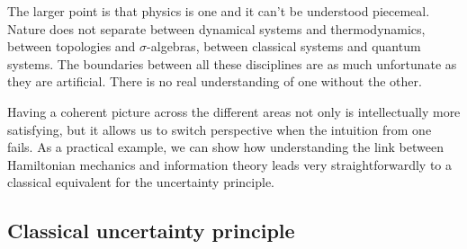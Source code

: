 \documentclass[11pt]{article}
\begin{document}
The larger point is that physics is one and it can't be understood piecemeal. Nature does not separate between dynamical systems and thermodynamics, between topologies and $\sigma$-algebras, between classical systems and quantum systems. The boundaries between all these disciplines are as much unfortunate as they are artificial. There is no real understanding of one without the other.

Having a coherent picture across the different areas not only is intellectually more satisfying, but it allows us to switch perspective when the intuition from one fails. As a practical example, we can show how understanding the link between Hamiltonian mechanics and information theory leads very straightforwardly to a classical equivalent for the uncertainty principle.

\subsection*{Classical uncertainty principle}
\end{document}
